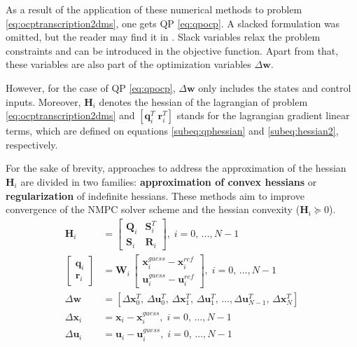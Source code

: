 As a result of the application of these numerical methods to problem \eqref{eq:ocptranscription2dms}, one gets QP \eqref{eq:qpocp}. A slacked formulation was omitted, but the reader may find it in \cite{verschueren2022acados}. Slack variables relax the problem constraints and can be introduced in the objective function. Apart from that, these variables are also part of the optimization variables $\Delta \mathbf{w}$.

However, for the case of QP \eqref{eq:qpocp}, $\Delta \mathbf{w}$ only includes the states and control inputs. Moreover, $\mathbf{H}_i$ denotes the hessian of the lagrangian of problem \eqref{eq:ocptranscription2dms} and $\left[\mathbf{q}^T_i \; \mathbf{r}^T_i\right]$ stands for the lagrangian gradient linear terms, which are defined on equations \eqref{subeq:qphessian} and \eqref{subeq:hessian2}, respectively.

For the sake of brevity, approaches to address the approximation of the hessian $\mathbf{H}_i$ are divided in two families: \textbf{approximation of convex hessians} or \textbf{regularization} of indefinite hessians. These methods aim to improve convergence of the NMPC solver scheme and the hessian convexity ($\mathbf{H}_i \succeq 0$).
\begin{subequations}\label{eq:qpdefinitions}
\begin{align}
\mathbf{H}_i &= \begin{bmatrix}
\mathbf{Q}_i & \mathbf{S}_i^T\\
\mathbf{S}_i & \mathbf{R}_i
\end{bmatrix},\; i = 0,\,\ldots,N-1 \label{subeq:qphessian} \\
\begin{bmatrix} \mathbf{q}_i \\ \mathbf{r}_i \end{bmatrix} &= \mathbf{W}_i \, \begin{bmatrix} \mathbf{x}_i^{guess} -  \mathbf{x}_i^{ref} \\  \mathbf{u}_i^{guess} -  \mathbf{u}_i^{ref} \end{bmatrix},\; i = 0,\,\ldots,N-1 \label{subeq:hessian2} \\
\Delta \mathbf{w} &= \left[\Delta \mathbf{x}^T_0, \,\Delta \mathbf{u}^T_0, \, \Delta \mathbf{x}^T_1, \,\Delta \mathbf{u}^T_1,\,\ldots, \Delta \mathbf{u}^T_{N-1},\, \Delta \mathbf{x}^T_N \right]  \label{subeq:qpoptvar} \\
\Delta \mathbf{x}_i &= \mathbf{x}_i - \mathbf{x}_i^{guess},\; i = 0,\,\ldots,N-1 \label{subeq:qpstates} \\
\Delta \mathbf{u}_i &= \mathbf{u}_i - \mathbf{u}_i^{guess},\; i = 0,\,\ldots,N-1\label{subeq:qpcontrols}
\end{align}
\end{subequations}

